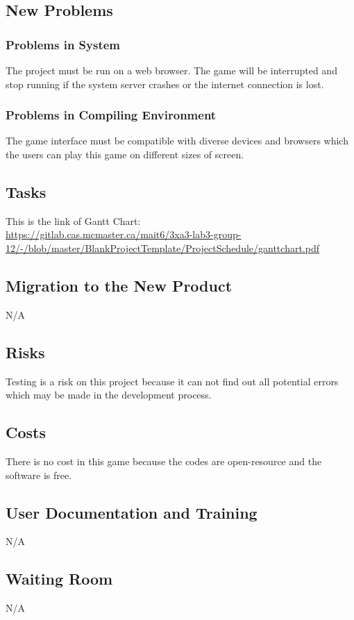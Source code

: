 \documentclass[12pt, titlepage]{article}
\begin{document}
\subsection{New Problems}
\subsubsection{Problems in System}
The project must be run on a web browser. The game will be interrupted and stop running if the system server crashes or the internet connection is lost. 
\subsubsection{Problems in Compiling Environment}
The game interface must be compatible with diverse devices and browsers which the users can play this game on different sizes of screen. 

\subsection{Tasks}
This is the link of Gantt Chart:\\
\url{https://gitlab.cas.mcmaster.ca/mait6/3xa3-lab3-group-12/-/blob/master/BlankProjectTemplate/ProjectSchedule/ganttchart.pdf}

\subsection{Migration to the New Product}

N/A

\subsection{Risks}
Testing is a risk on this project because it can not find out all potential errors which may be made in the development process. 


\subsection{Costs}
There is no cost in this game because the codes are open-resource and the software is free.

\subsection{User Documentation and Training}
N/A
\subsection{Waiting Room}
N/A
\end{document}
